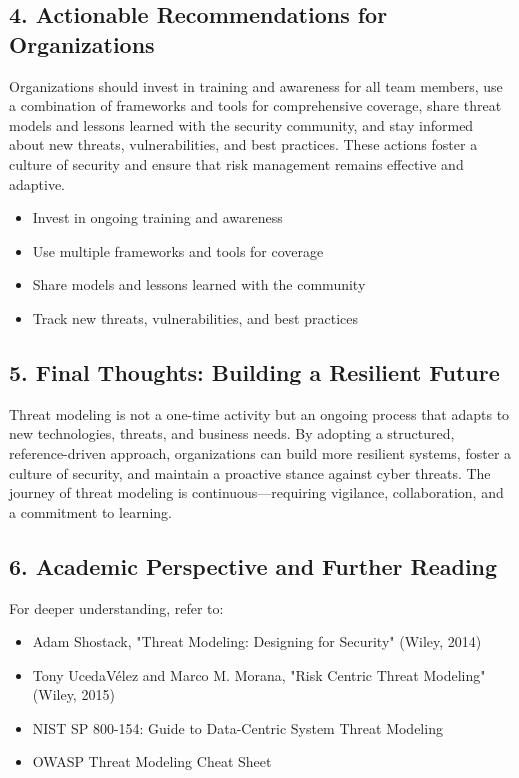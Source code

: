 \subsection*{4. Actionable Recommendations for Organizations}
Organizations should invest in training and awareness for all team members, use a combination of frameworks and tools for comprehensive coverage, share threat models and lessons learned with the security community, and stay informed about new threats, vulnerabilities, and best practices\cite{owasp,shostack2014}. These actions foster a culture of security and ensure that risk management remains effective and adaptive.
\begin{itemize}
	\item Invest in ongoing training and awareness
	\item Use multiple frameworks and tools for coverage
	\item Share models and lessons learned with the community
	\item Track new threats, vulnerabilities, and best practices
\end{itemize}

\subsection*{5. Final Thoughts: Building a Resilient Future}
Threat modeling is not a one-time activity but an ongoing process that adapts to new technologies, threats, and business needs. By adopting a structured, reference-driven approach, organizations can build more resilient systems, foster a culture of security, and maintain a proactive stance against cyber threats. The journey of threat modeling is continuous—requiring vigilance, collaboration, and a commitment to learning.

\subsection*{6. Academic Perspective and Further Reading}
For deeper understanding, refer to:
\begin{itemize}
	\item Adam Shostack, "Threat Modeling: Designing for Security" (Wiley, 2014)
	\item Tony UcedaVélez and Marco M. Morana, "Risk Centric Threat Modeling" (Wiley, 2015)
	\item NIST SP 800-154: Guide to Data-Centric System Threat Modeling
	\item OWASP Threat Modeling Cheat Sheet
\end{itemize}
